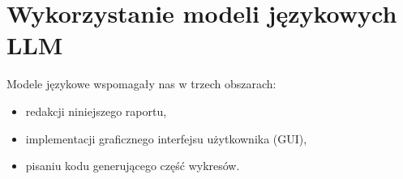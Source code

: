 \section{Wykorzystanie modeli językowych LLM}
\label{sec:llm}

Modele językowe wspomagały nas w trzech obszarach:
\begin{itemize}[nosep]
    \item redakcji niniejszego raportu,
    \item implementacji graficznego interfejsu użytkownika (GUI),
    \item pisaniu kodu generującego część wykresów.
\end{itemize}
